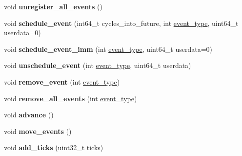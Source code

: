 \begin{DoxyCompactItemize}
void {\bfseries unregister\+\_\+all\+\_\+events} ()
\item 
\mbox{\label{classeka2l1_1_1timing__system_a8c762876961a776b129029790452e37c}} 
void {\bfseries schedule\+\_\+event} (int64\+\_\+t cycles\+\_\+into\+\_\+future, int \mbox{\hyperlink{structeka2l1_1_1event__type}{event\+\_\+type}}, uint64\+\_\+t userdata=0)
\item 
\mbox{\label{classeka2l1_1_1timing__system_ad8bb257c1ec5391014714a4eb113f5cc}} 
void {\bfseries schedule\+\_\+event\+\_\+imm} (int \mbox{\hyperlink{structeka2l1_1_1event__type}{event\+\_\+type}}, uint64\+\_\+t userdata=0)
\item 
\mbox{\label{classeka2l1_1_1timing__system_a41e1f342ad7455ac20c9227c7cf4b60f}} 
void {\bfseries unschedule\+\_\+event} (int \mbox{\hyperlink{structeka2l1_1_1event__type}{event\+\_\+type}}, uint64\+\_\+t userdata)
\item 
\mbox{\label{classeka2l1_1_1timing__system_a12393f6b77fdca495bbbd6cf89d97e4c}} 
void {\bfseries remove\+\_\+event} (int \mbox{\hyperlink{structeka2l1_1_1event__type}{event\+\_\+type}})
\item 
\mbox{\label{classeka2l1_1_1timing__system_a3c27f2a26202cf4ed16a6bfcfedfdbac}} 
void {\bfseries remove\+\_\+all\+\_\+events} (int \mbox{\hyperlink{structeka2l1_1_1event__type}{event\+\_\+type}})
\item 
\mbox{\label{classeka2l1_1_1timing__system_aaa737c2bc2b87a8827e1e93b2ef8063b}} 
void {\bfseries advance} ()
\item 
\mbox{\label{classeka2l1_1_1timing__system_a82650bda40f63d6aba2e9f6bf29b4687}} 
void {\bfseries move\+\_\+events} ()
\item 
\mbox{\label{classeka2l1_1_1timing__system_ae228a2a6a2080e4c03df78ba8e0beb35}} 
void {\bfseries add\+\_\+ticks} (uint32\+\_\+t ticks)
\item 
\mbox{\label{classeka2l1_1_1timing__system_a0566f684c575c7a19d35e34862dd3415}} 

\end{DoxyCompactItemize}
